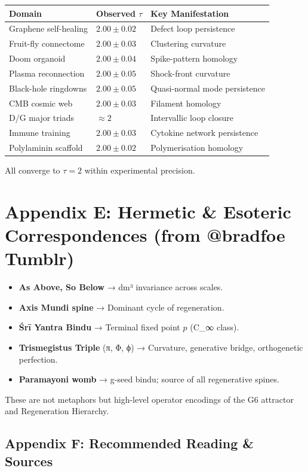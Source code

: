 \documentclass[19pt]{book}
\theoremstyle{plain}
\theoremstyle{definition}
\theoremstyle{remark}
\begin{document}
\begin{enumerate}
\begin{tabular}{l|l|l}
Domain & Observed \(\tau\) & Key Manifestation \\
\hline
Graphene self-healing & \(2.00 \pm 0.02\) & Defect loop persistence \\
Fruit-fly connectome & \(2.00 \pm 0.03\) & Clustering curvature \\
Doom organoid & \(2.00 \pm 0.04\) & Spike-pattern homology \\
Plasma reconnection & \(2.00 \pm 0.05\) & Shock-front curvature \\
Black-hole ringdowns & \(2.00 \pm 0.05\) & Quasi-normal mode persistence \\
CMB cosmic web & \(2.00 \pm 0.03\) & Filament homology \\
D/G major triads & \(\approx 2\) & Intervallic loop closure \\
Immune training & \(2.00 \pm 0.03\) & Cytokine network persistence \\
Polylaminin scaffold & \(2.00 \pm 0.02\) & Polymerisation homology \\
\end{tabular}

All converge to \(\tau = 2\) within experimental precision.

\chapter{Appendix E: Hermetic & Esoteric Correspondences (from @bradfoe Tumblr)}

\begin{itemize}
\item \textbf{As Above, So Below} → dm³ invariance across scales.
\item \textbf{Axis Mundi spine} → Dominant cycle of regeneration.
\item \textbf{Śrī Yantra Bindu} → Terminal fixed point \(p\) (C_∞ class).
\item \textbf{Trismegistus Triple} (π, Φ, ϕ) → Curvature, generative bridge, orthogenetic perfection.
\item \textbf{Paramayoni womb} → g-seed bindu; source of all regenerative spines.
\end{itemize}

These are not metaphors but high-level operator encodings of the G6 attractor and Regeneration Hierarchy.

\section{Appendix F: Recommended Reading \& Sources}


\end{enumerate}
\end{document}
